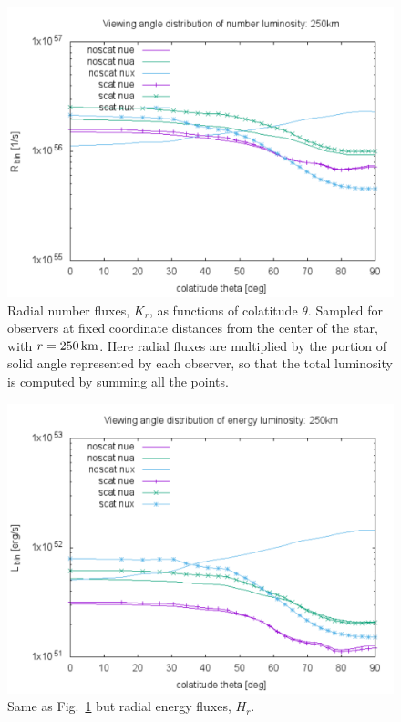 \documentclass[aps,floatfix,prd,superscriptaddress,twocolumn]{revtex4-1}
\begin{document}
\begin{figure}
  \includegraphics[width=\columnwidth]{theta_distrib-250km-luminosity_R}
  \caption{Radial number fluxes, $K_r$, as functions of colatitude $\theta$.
    Sampled for observers at fixed coordinate distances from the center
    of the star, with $r=250\,{\rm km}$.
    Here radial fluxes are multiplied by the portion of solid angle
    represented by each observer, so that the total luminosity is
    computed by summing all the points.}
  \label{fig:nsns_theta_distrib_R}
\end{figure}

\begin{figure}
  \includegraphics[width=\columnwidth]{theta_distrib-250km-luminosity_L}
  \caption{Same as Fig.~\ref{fig:nsns_theta_distrib_R} but radial energy
    fluxes, $H_r$.}
  \label{fig:nsns_theta_distrib_L}
\end{figure}
\end{document}
